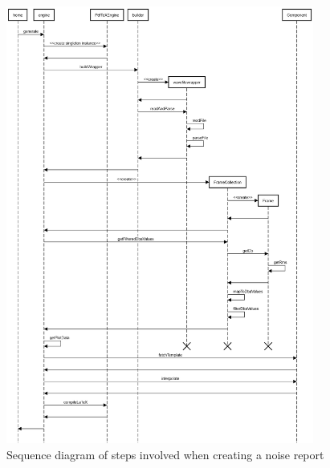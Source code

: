 \begin{figure}[H]
    \centering
    \includegraphics[width=0.9\textwidth]{../assets/sequence_diagram_from_wave_file_to_pdf.png}
    \caption{Sequence diagram of steps involved when creating a noise report}\label{fig:sequence-diagram-noise-report}
\end{figure}

